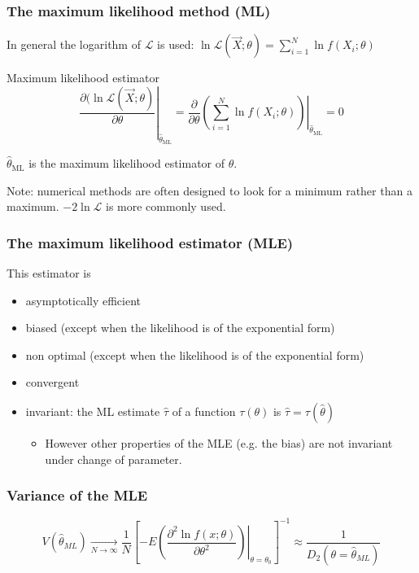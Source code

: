 \documentclass[9pt]{beamer}
\begin{document}
\begin{frame}
 \frametitle{The maximum likelihood method (ML)}
 
 In general the logarithm of $\mathcal{L}$ is used: $\ln \mathcal{L}\left(\vec{X};\theta\right) = \sum_{i=1}^N \ln f(X_i;\theta)$
 
 \begin{block}{Maximum likelihood estimator}
  $$\left. \frac{\partial (\ln \mathcal{L} \left(\vec{X};\theta\right)}{\partial \theta}\right|_{\hat{\theta}_\text{ML}} = \left.\frac{\partial}{\partial \theta} \left(  \sum_{i=1}^N \ln f(X_i;\theta) \right)\right|_{\hat{\theta}_\text{ML}} = 0$$
  
  $\hat{\theta}_\text{ML}$ is the maximum likelihood estimator of $\theta$.
 \end{block}

 Note: numerical methods are often designed to look for a minimum rather than a maximum. $-2 \ln \mathcal{L}$ is more commonly used.
\end{frame}

\begin{frame}
 \frametitle{The maximum likelihood estimator (MLE)}
 
 This estimator is 
 \begin{itemize}
  \item asymptotically efficient
  \item biased (except when the likelihood is of the exponential form)
  \item non optimal (except when the likelihood is of the exponential form)
  \item convergent
  \item invariant: the ML estimate $\hat{\tau}$ of a function $\tau(\theta)$ is $\hat{\tau} = \tau(\hat{\theta})$
  \begin{itemize}
   \item However other properties of the MLE (e.g. the bias) are not invariant under change of parameter.
  \end{itemize}

 \end{itemize}

\end{frame}

\begin{frame}
 \frametitle{Variance of the MLE}
 
 $$V(\hat{\theta}_{ML}) \xrightarrow[N\to\infty]{} \frac{1}{N} \left[ \left.-E\left(\frac{\partial^2\ln f(x;\theta)}{\partial \theta^2}\right)\right|_{\theta=\theta_0} \right]^{-1} \approx \frac{1}{D_2(\theta=\hat{\theta}_{ML})}$$
 
\end{frame}
\end{document}
